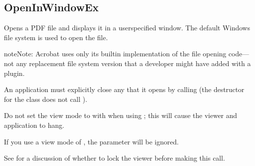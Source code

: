 \documentclass[letterpaper,12pt,english,openany,oneside]{sphinxmanual}
\begin{document}
\subsection{OpenInWindowEx}
\label{\detokenize{IAC_API_OLE_Objects:openinwindowex}}
Opens a PDF file and displays it in a user\sphinxhyphen{}specified window. The default Windows file system is used to open the file.

\begin{sphinxadmonition}{note}{Note:}
Acrobat uses only its built\sphinxhyphen{}in implementation of the file opening code—not any replacement file system version that a developer might have added with a plug\sphinxhyphen{}in.
\end{sphinxadmonition}

An application must explicitly close any  that it opens by calling   (the destructor for the  class does not call   ).

Do not set the view mode to  with   when using   ; this will cause the viewer and application to hang.

If you use a view mode of , the  parameter will be ignored.

See   for a discussion of whether to lock the viewer before making this call.


\begin{sphinxVerbatim}[commandchars=\\\{\}]
    

                    

                    

                      

                  
\end{sphinxVerbatim}
\label{\detokenize{IAC_API_OLE_Objects:parameters-24}}
\end{document}
